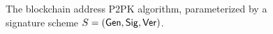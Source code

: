 \begin{figure}
\begin{algorithm}[H]
    \caption{\label{alg.p2pk} The blockchain address P2PK algorithm,
    parameterized by a signature scheme $S = (\mathsf{Gen}, \mathsf{Sig}, \mathsf{Ver})$.}
    \begin{algorithmic}[1]
            \State{}
        \EndFunction
            \State{}
        \EndFunction
        \vskip8pt
    \end{algorithmic}
\end{algorithm}
\end{figure}
